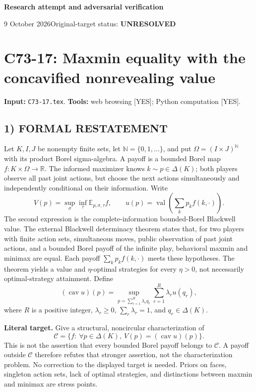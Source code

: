 \documentclass[11pt,a4paper]{article}
\theoremstyle{definition}
\theoremstyle{remark}
\begin{document}
{\large\bfseries Research attempt and adversarial verification}\par
9 October 2026\hfill Original-target status: \textbf{UNRESOLVED}\par
\section{C73-17: Maxmin equality with the concavified nonrevealing value}
\label{sec:C73-17}
\noindent\textbf{Input:} \texttt{C73-17.tex}. \quad\textbf{Tools:} web browsing [YES]; Python computation [YES].
\subsection*{1) FORMAL RESTATEMENT}
Let $K,I,J$ be nonempty finite sets, let $\mathbb N=\{0,1,\ldots\}$, and put $\Omega=(I\times J)^{\mathbb N}$ with its product Borel sigma-algebra. A payoff is a bounded Borel map $f:K\times\Omega\to\mathbb R$. The informed maximizer knows $k\sim p\in\Delta(K)$; both players observe all past joint actions, but choose the next actions simultaneously and independently conditional on their information. Write
\[
 V(p)=\sup_\sigma\inf_\tau\mathbb E_{p,\sigma,\tau}f,
 \qquad u(p)=\operatorname{val}\left(\sum_kp_kf(k,\cdot)\right).
\]
The second expression is the complete-information bounded-Borel Blackwell value. The external Blackwell determinacy theorem \cite{martin-blackwell} states that, for two players with finite action sets, simultaneous moves, public observation of past joint actions, and a bounded Borel payoff of the infinite play, behavioral maxmin and minimax are equal. Each payoff $\sum_k p_kf(k,\cdot)$ meets these hypotheses. The theorem yields a value and $\eta$-optimal strategies for every $\eta>0$, not necessarily optimal-strategy attainment. Define
\[
 (\operatorname{cav}u)(p)=\sup_{p=\sum_{r=1}^R\lambda_rq_r}
       \sum_{r=1}^R\lambda_ru(q_r),
\]
where $R$ is a positive integer, $\lambda_r\geq0$, $\sum_r\lambda_r=1$, and $q_r\in\Delta(K)$.

\textbf{Literal target.} Give a structural, noncircular characterization of
\[
 \mathcal C=\{f:\ \forall p\in\Delta(K),\ V(p)=(\operatorname{cav}u)(p)\}.
\]
This is not the assertion that every bounded Borel payoff belongs to $\mathcal C$. A payoff outside $\mathcal C$ therefore refutes that stronger assertion, not the characterization problem. No correction to the displayed target is needed. Priors on faces, singleton action sets, lack of optimal strategies, and distinctions between maxmin and minimax are stress points.
\end{document}
